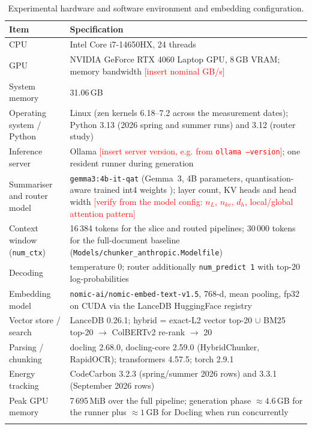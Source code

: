 \documentclass[pdflatex,sn-mathphys-num]{sn-jnl}
\newcommand{\todo}[1]{\textcolor{red}{#1}}
\theoremstyle{thmstyleone}%
\theoremstyle{thmstylethree}%
\begin{document}
\begin{table}[htbp]
\caption{Experimental hardware and software environment and embedding configuration.}\label{tab:hardware}
\begin{tabular}{@{}p{4.2cm}p{8.6cm}@{}}
\toprule
Item & Specification \\
\midrule
CPU & Intel Core i7-14650HX, 24 threads \\
GPU & NVIDIA GeForce RTX 4060 Laptop GPU, 8\,GB VRAM; memory bandwidth \todo{[insert nominal GB/s]} \\
System memory & 31.06\,GB \\
Operating system / Python & Linux (zen kernels 6.18--7.2 across the measurement dates); Python 3.13 (2026 spring and summer runs) and 3.12 (router study) \\
Inference server & Ollama \todo{[insert server version, e.g. from \texttt{ollama --version}]}; one resident runner during generation \\
Summariser and router model & \texttt{gemma3:4b-it-qat} (Gemma~3, 4B parameters, quantisation-aware trained int4 weights \cite{gemma3report2025,jacob2018quantization}); layer count, KV heads and head width \todo{[verify from the model config: $n_L$, $n_{kv}$, $d_h$, local/global attention pattern]} \\
Context window (\texttt{num\_ctx}) & 16\,384 tokens for the slice and routed pipelines; 30\,000 tokens for the full-document baseline (\texttt{Models/chunker\_anthropic.Modelfile}) \\
Decoding & temperature 0; router additionally \texttt{num\_predict 1} with top-20 log-probabilities \\
Embedding model & \texttt{nomic-ai/nomic-embed-text-v1.5}, 768-d, mean pooling, fp32 on CUDA via the LanceDB HuggingFace registry \\
Vector store / search & LanceDB 0.26.1; hybrid = exact-L2 vector top-20 $\cup$ BM25 top-20 $\rightarrow$ ColBERTv2 re-rank $\rightarrow$ 20 \\
Parsing / chunking & docling 2.68.0, docling-core 2.59.0 (HybridChunker, RapidOCR); transformers 4.57.5; torch 2.9.1 \\
Energy tracking & CodeCarbon 3.2.3 (spring/summer 2026 rows) and 3.3.1 (September 2026 rows) \\
Peak GPU memory & 7\,695\,MiB over the full pipeline; generation phase $\approx 4.6$\,GB for the runner plus $\approx 1$\,GB for Docling when run concurrently \\
\botrule
\end{tabular}

\end{table}
\end{document}
